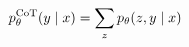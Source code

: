\documentclass[border=3pt]{standalone}
\begin{document}
\color{ink}\fontsize{23}{28}\selectfont
$\displaystyle p^{\rm CoT}_\theta(y\mid x)=\sum_z p_\theta(z,y\mid x)$
\end{document}
